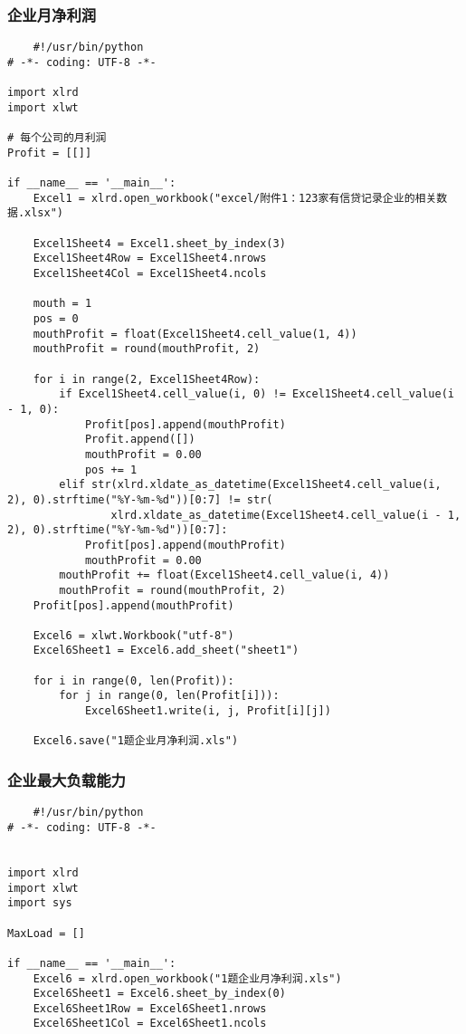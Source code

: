 \documentclass[dvipsnames,withoutpreface,bwprint]{cumcmthesis}
\begin{document}
\begin{appendices}
\subsubsection{企业月净利润}
\begin{lstlisting}
    #!/usr/bin/python
# -*- coding: UTF-8 -*-

import xlrd
import xlwt

# 每个公司的月利润
Profit = [[]]

if __name__ == '__main__':
    Excel1 = xlrd.open_workbook("excel/附件1：123家有信贷记录企业的相关数据.xlsx")

    Excel1Sheet4 = Excel1.sheet_by_index(3)
    Excel1Sheet4Row = Excel1Sheet4.nrows
    Excel1Sheet4Col = Excel1Sheet4.ncols

    mouth = 1
    pos = 0
    mouthProfit = float(Excel1Sheet4.cell_value(1, 4))
    mouthProfit = round(mouthProfit, 2)

    for i in range(2, Excel1Sheet4Row):
        if Excel1Sheet4.cell_value(i, 0) != Excel1Sheet4.cell_value(i - 1, 0):
            Profit[pos].append(mouthProfit)
            Profit.append([])
            mouthProfit = 0.00
            pos += 1
        elif str(xlrd.xldate_as_datetime(Excel1Sheet4.cell_value(i, 2), 0).strftime("%Y-%m-%d"))[0:7] != str(
                xlrd.xldate_as_datetime(Excel1Sheet4.cell_value(i - 1, 2), 0).strftime("%Y-%m-%d"))[0:7]:
            Profit[pos].append(mouthProfit)
            mouthProfit = 0.00
        mouthProfit += float(Excel1Sheet4.cell_value(i, 4))
        mouthProfit = round(mouthProfit, 2)
    Profit[pos].append(mouthProfit)

    Excel6 = xlwt.Workbook("utf-8")
    Excel6Sheet1 = Excel6.add_sheet("sheet1")

    for i in range(0, len(Profit)):
        for j in range(0, len(Profit[i])):
            Excel6Sheet1.write(i, j, Profit[i][j])

    Excel6.save("1题企业月净利润.xls")
\end{lstlisting}
\subsubsection{企业最大负载能力}
\begin{lstlisting}
    #!/usr/bin/python
# -*- coding: UTF-8 -*-


import xlrd
import xlwt
import sys

MaxLoad = []

if __name__ == '__main__':
    Excel6 = xlrd.open_workbook("1题企业月净利润.xls")
    Excel6Sheet1 = Excel6.sheet_by_index(0)
    Excel6Sheet1Row = Excel6Sheet1.nrows
    Excel6Sheet1Col = Excel6Sheet1.ncols


\end{lstlisting}
\end{appendices}
\end{document}
